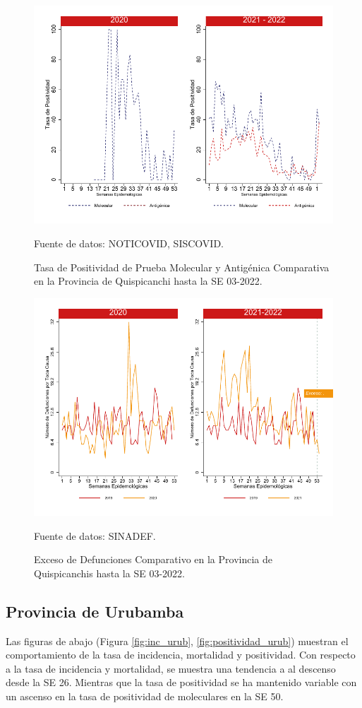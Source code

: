 \documentclass[12pt,a4paper,openany]{book}
\begin{document}
		\begin{figure}[h]
			\caption{Tasa de Positividad de Prueba Molecular y Antigénica Comparativa en la Provincia de Quispicanchi hasta la SE 03-2022.}\label{fig:positividad_quisp}
			\begin{center}
				\includegraphics[width=0.7\linewidth]{../figuras/positividad_20_21_12}
			\end{center}
			{\footnotesize {Fuente de datos: NOTICOVID, SISCOVID.}}
		\end{figure}
		
		\begin{figure}[h]
			\caption{Exceso de Defunciones Comparativo en la Provincia de Quispicanchis hasta la SE 03-2022.}\label{fig:exceso_quisp}
			\begin{center}
				\includegraphics[width=0.7\linewidth]{../figuras/exceso_12}
			\end{center}
			{\footnotesize {Fuente de datos: SINADEF.}}
		\end{figure}
		
		\clearpage
		
		\subsection*{Provincia de Urubamba}
		\noindent Las figuras de abajo (Figura \ref{fig:inc_urub}, \ref{fig:positividad_urub}) muestran el comportamiento de la tasa de incidencia, mortalidad y positividad. Con respecto a la tasa de incidencia y mortalidad, se muestra una tendencia a al descenso desde la SE 26. Mientras que la tasa de positividad se ha mantenido variable con un ascenso en la tasa de positividad de moleculares en la SE 50.
	
\end{document}

